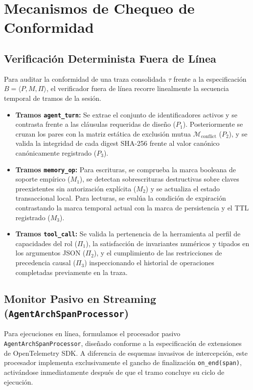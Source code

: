 \documentclass[conference]{IEEEtran}
\begin{document}
\section{Mecanismos de Chequeo de Conformidad}

\subsection{Verificaci\'on Determinista Fuera de L\'inea}
Para auditar la conformidad de una traza consolidada $\tau$ frente a la especificaci\'on $B = \langle P, M, \Pi \rangle$, el verificador fuera de l\'inea recorre linealmente la secuencia temporal de tramos de la sesi\'on.
\begin{itemize}
    \item \textbf{Tramos \texttt{agent\_turn}:} Se extrae el conjunto de identificadores activos y se contrasta frente a las cl\'ausulas requeridas de dise\~no ($P_1$). Posteriormente se cruzan los pares con la matriz est\'atica de exclusi\'on mutua $\mathcal{M}_{\text{conflict}}$ ($P_2$), y se valida la integridad de cada digest SHA-256 frente al valor can\'onico can\'onicamente registrado ($P_3$).
    \item \textbf{Tramos \texttt{memory\_op}:} Para escrituras, se comprueba la marca booleana de soporte emp\'irico ($M_1$), se detectan sobrescrituras destructivas sobre claves preexistentes sin autorizaci\'on expl\'icita ($M_2$) y se actualiza el estado transaccional local. Para lecturas, se eval\'ua la condici\'on de expiraci\'on contrastando la marca temporal actual con la marca de persistencia y el TTL registrado ($M_3$).
    \item \textbf{Tramos \texttt{tool\_call}:} Se valida la pertenencia de la herramienta al perfil de capacidades del rol ($\Pi_1$), la satisfacci\'on de invariantes num\'ericos y tipados en los argumentos JSON ($\Pi_2$), y el cumplimiento de las restricciones de precedencia causal ($\Pi_3$) inspeccionando el historial de operaciones completadas previamente en la traza.
\end{itemize}

\subsection{Monitor Pasivo en Streaming (\texttt{AgentArchSpanProcessor})}
Para ejecuciones en l\'inea, formulamos el procesador pasivo \texttt{AgentArchSpanProcessor}, dise\~nado conforme a la especificaci\'on de extensiones de OpenTelemetry SDK. A diferencia de esquemas invasivos de intercepci\'on, este procesador implementa exclusivamente el gancho de finalizaci\'on \texttt{on\_end(span)}, activ\'andose inmediatamente despu\'es de que el tramo concluye su ciclo de ejecuci\'on.
\end{document}
